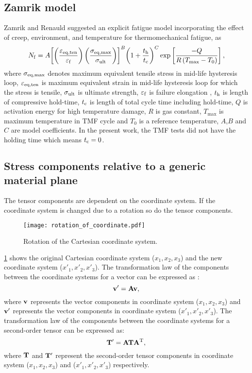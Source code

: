 \subsection{Zamrik model}
\noindent
Zamrik and Renauld \cite{Zamrik2000} suggested an explicit fatigue model incorporating the effect of creep, environment, and temperature for thermomechanical fatigue, as
\begin{equation}
{N_{\rm f}} = A{\left[ {\left( {\frac{{{\varepsilon _{\rm eq,ten}}}}{{{\varepsilon _{\rm f}}}}} \right)\left( {\frac{{{\sigma _{\rm eq,\max }}}}{{{\sigma _{\rm{ult}}}}}} \right)} \right]^B}
{\left( {1 + \frac{{{t_{\rm{h}}}}}{{{t_{\rm{c}}}}}} \right)^C} \exp \left[ {\frac{{ - Q}}{{R\left( {{T_{\max }} - {T_0}} \right)}}} \right],
\label{Equ:Zamrik_model}
\end{equation}
where $\sigma _{\rm eq,\max }$ denotes maximum equivalent tensile stress in mid-life hysteresis loop, $\varepsilon _{\rm eq,ten}$ is maximum equivalent strain in mid-life hysteresis loop for which the stress is tensile, $\sigma _{\rm ult}$ is ultimate strength, $\varepsilon _{\rm f}$ is failure elongation , $t_{\rm{h}}$ is length of compressive hold-time, $t_{\rm{c}}$ is length of total cycle time including hold-time, $Q$ is activation energy for high temperature damage, $R$ is gas constant, $T_{\max}$ is maximum temperature in TMF cycle and $T_0$ is a reference temperature, $A$,$B$ and $C$ are model coefficients. In the present work, the TMF tests did not have the holding time which means $t_{\rm{c}}=0$.

\subsection{Stress components relative to a generic material plane}
\noindent
The tensor components are dependent on the coordinate system.
If the coordinate system is changed due to a rotation so do the tensor components.
\begin{figure}
\centering
\texttt{[image: rotation\_of\_coordinate.pdf]}
\caption{Rotation of the Cartesian coordinate system.}
\label{Fig:rotation_of_coordinate}
\end{figure}
\ref{Fig:rotation_of_coordinate} shows the original Cartesian coordinate system ($x_1,x_2,x_3$) and the new coordinate system ($x'_1,x'_2,x'_3$).
The transformation law of the components between the coordinate systems for a vector can be expressed as \cite{Chaves2013Notes}:
\begin{equation}
\bf{v'} = {\bf{A}}\bf{v},
\label{Equ:coordinate_transformation_of_vector}
\end{equation}
where $\bf{v}$ represents the vector components in coordinate system ($x_1,x_2,x_3$) and $\bf{v'}$ represents the vector components in coordinate system ($x'_1,x'_2,x'_3$).
The transformation law of the components between the coordinate systems for a second-order tensor can be expressed as:
\begin{equation}
{\bf{T'}} = {\bf{AT}}{{\bf{A}}^{\rm{T}}},
\label{Equ:coordinate_transformation_of_tensor}
\end{equation}
where $\bf{T}$ and $\bf{T'}$ represent the second-order tensor components in coordinate system ($x_1,x_2,x_3$) and ($x'_1,x'_2,x'_3$) respectively.

